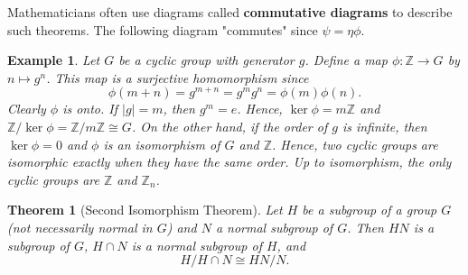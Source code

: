 \documentclass[12pt]{article}
\newtheorem{thm}{Theorem}[section]
\theoremstyle{plain}
\newtheorem{example}{Example}[chapter]
\begin{document}
\medskip


Mathematicians often use diagrams called \textbf{commutative diagrams} to describe such theorems. The
following diagram "commutes" since $\psi = \eta \phi$.



\begin{center}



\end{center}



\begin{example}
Let $G$ be a cyclic group with generator $g$. Define a map $\phi :
{\mathbb Z} \rightarrow G$ by $n \mapsto g^n$.  This map is a surjective
homomorphism since
\[
\phi( m + n) = g^{m+n} = g^m g^n = \phi(m) \phi(n).
\]
Clearly $\phi$ is onto. If $|g| = m$, then  $g^m = e$. Hence, $\ker
\phi = m {\mathbb Z}$ and ${\mathbb Z} / \ker \phi =  {\mathbb Z} / m {\mathbb Z}
\cong G$. On the other hand, if the order of $g$ is infinite, then
$\ker \phi = 0$ and $\phi$ is an isomorphism of $G$ and ${\mathbb Z}$.
Hence, two cyclic groups are isomorphic exactly when they have the
same order. Up to isomorphism, the only cyclic groups are ${\mathbb Z}$
and ${\mathbb Z}_n$.
\end{example}


\begin{thm}[Second Isomorphism Theorem]
Let  $H$ be a subgroup of a group $G$ (not necessarily normal in $G$)
and $N$ a normal subgroup of $G$.  Then $HN$ is a subgroup of $G$,
$H \cap N$ is a normal subgroup of $H$, and
\[
H / H \cap N \cong HN /N.
\]
\end{thm}
\end{document}
